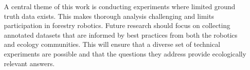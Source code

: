 A central theme of this work is conducting experiments where limited ground truth data exists. This makes thorough analysis challenging and limits participation in forestry robotics. Future research should focus on collecting annotated datasets that are informed by best practices from both the robotics and ecology communities. This will ensure that a diverse set of technical experiments are possible and that the questions they address provide ecologically relevant answers.